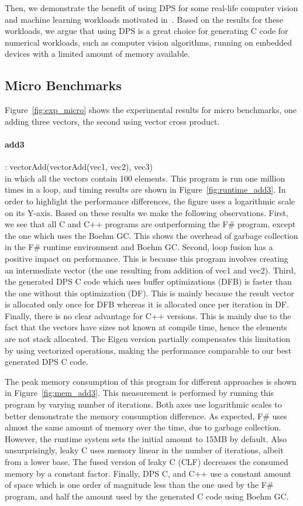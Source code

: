 Then, we demonstrate the benefit of using DPS for some real-life computer vision and machine learning workloads motivated in~\cite{srajerbenchmark}. Based on the results for these workloads, we argue that using DPS is a great choice for generating C code for numerical workloads, such as computer vision algorithms, running on embedded devices with a limited amount of memory available. 
\subsection{Micro Benchmarks}

Figure~\ref{fig:exp_micro} shows the experimental results for micro benchmarks, one adding three vectors, the second using vector cross product.



\paragraph{add3}: vectorAdd(vectorAdd(vec1, vec2), vec3)\\ 
in which all the vectors contain 100 elements. This program is run one million times in a loop, and timing results are shown in Figure~\ref{fig:runtime_add3}.
In order to highlight the performance differences, the figure uses a logarithmic scale on its Y-axis. Based on these results we make the following observations.
First, we see that all C and C++ programs are outperforming the F\# program, except the one which uses the Boehm GC.
This shows the overhead of garbage collection in the F\# runtime environment and Boehm GC.
Second, loop fusion has a positive impact on performance. This is because this program involves creating an intermediate vector (the one resulting from addition of vec1 and vec2). 
Third, the generated DPS C code which uses buffer optimizations (DFB) is faster than the one without this optimization (DF). 
This is mainly because the result vector is allocated only once for DFB whereas it is allocated once per iteration in DF. Finally, there is no clear advantage for C++ versions.  This is mainly due to the fact that the vectors have sizes not known at compile time, hence the elements are not stack allocated. The Eigen version partially compensates this limitation by using vectorized operations, making the performance comparable to our best generated DPS C code.

The peak memory consumption of this program for different approaches is shown in Figure~\ref{fig:mem_add3}. This measurement is performed by running this program by varying number of iterations. Both axes use logarithmic scales to better demonstrate the memory consumption difference. As expected, F\# uses almost the same amount of memory over the time, due to garbage collection. However, the runtime system sets the initial amount to 15MB by default. Also unsurprisingly, leaky C uses memory linear in the number of iterations, albeit from a lower base.  The fused version of leaky C (CLF) decreases the consumed memory by a constant factor. Finally, DPS C, and C++ use a constant amount of space which is one order of magnitude less than the one used by the F\# program, and half the amount used by the generated C code using Boehm GC.



